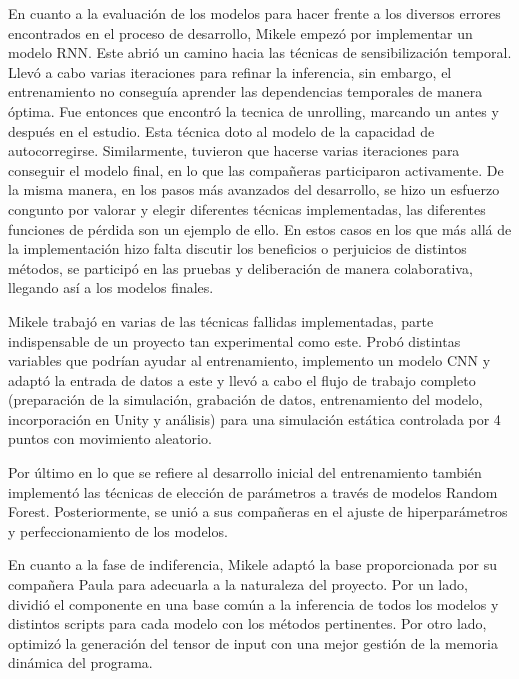 En cuanto a la evaluación de los modelos para hacer frente a los diversos errores encontrados en el proceso de desarrollo, Mikele empezó por implementar un modelo RNN. Este abrió un camino hacia las técnicas de sensibilización temporal. Llevó a cabo varias iteraciones para refinar la inferencia, sin embargo, el entrenamiento no conseguía aprender las dependencias temporales de manera óptima. Fue entonces que encontró la tecnica de unrolling, marcando un antes y después en el estudio. Esta técnica doto al modelo de la capacidad de autocorregirse. Similarmente, tuvieron que hacerse varias iteraciones para conseguir el modelo final, en lo que las compañeras participaron activamente. De la misma manera, en los pasos más avanzados del desarrollo, se hizo un esfuerzo congunto por valorar y elegir diferentes técnicas implementadas, las diferentes funciones de pérdida son un ejemplo de ello. En estos casos en los que más allá de la implementación hizo falta discutir los beneficios o perjuicios de distintos métodos, se participó en las pruebas y deliberación de manera colaborativa, llegando así a los modelos finales. \newline

Mikele trabajó en varias de las técnicas fallidas implementadas, parte indispensable de un proyecto tan experimental como este. Probó distintas variables que podrían ayudar al entrenamiento, implemento un modelo CNN y adaptó la entrada de datos a este y llevó a cabo el flujo de trabajo completo (preparación de la simulación, grabación de datos, entrenamiento del modelo, incorporación en Unity y análisis) para una simulación estática controlada por 4 puntos con movimiento aleatorio.  \newline

Por último en lo que se refiere al desarrollo inicial del entrenamiento también implementó las técnicas de elección de parámetros a través de modelos Random Forest. Posteriormente, se unió a sus compañeras en el ajuste de hiperparámetros y perfeccionamiento de los modelos. \newline

En cuanto a la fase de indiferencia, Mikele adaptó la base proporcionada por su compañera Paula para adecuarla a la naturaleza del proyecto. Por un lado, dividió el componente en una base común a la inferencia de todos los modelos y distintos scripts para cada modelo con los métodos pertinentes. Por otro lado, optimizó la generación del tensor de input con una mejor gestión de la memoria dinámica del programa.  \newline

